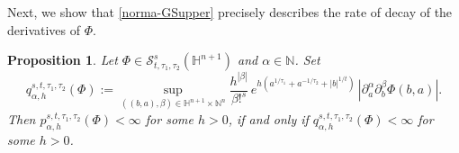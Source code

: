 \documentclass[reqno,12pt]{amsart}
\theoremstyle{plain}
\newtheorem{proposition}{Proposition}
\theoremstyle{definition}
\theoremstyle{remark}
\begin{document}
\par

Next, we show that \eqref{norma-GSupper} precisely describes the rate of decay of the derivatives of $ \Phi $.

\begin{proposition} \label{prop2}
Let $ \Phi  \in {\mathcal S}^{s}_{t, \tau_1, \tau_2} (\mathbb{H}^{n+1}) $
and  $ \alpha \in \mathbb{N}$. Set
$$
q_{\alpha, h}^{s, t, \tau_1, \tau_2} (\Phi) := \sup_{((b, a), \beta) \in
\mathbb{H}^{n+1} \times \mathbb{N}^n}
\frac{h^{|\beta|}}{\beta!^{s}} \, e^{h\left(a^{1/\tau_1} +
a^{-1/\tau_2} + |b|^{1/t} \right)} \, \left|\partial_a^{\alpha}
\partial_b^{\beta} \Phi (b, a) \right|.
$$
Then
$ p_{\alpha, h}^{s, t, \tau_1, \tau_2} (\Phi) < \infty $ for some $h>0$,
if and only if $ q_{\alpha, h}^{s, t, \tau_1, \tau_2}(\Phi) < \infty $ for some  $h>0$.
\end{proposition}
\end{document}
